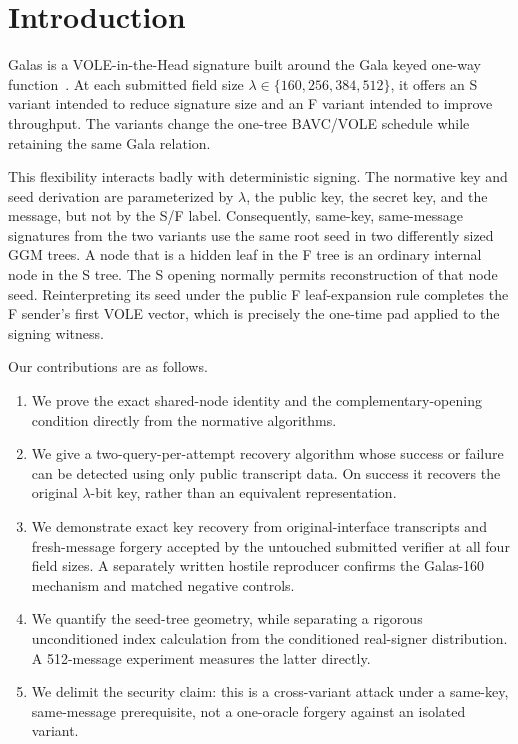 \documentclass[11pt,a4paper]{article}
\begin{document}
\section{Introduction}

Galas is a VOLE-in-the-Head signature built around the Gala keyed one-way
function~\cite{galas-spec,galas-design}.  At each submitted field size
$\lambda\in\{160,256,384,512\}$, it offers an S variant intended to reduce
signature size and an F variant intended to improve throughput.  The variants
change the one-tree BAVC/VOLE schedule while retaining the same Gala relation.

This flexibility interacts badly with deterministic signing.  The normative key
and seed derivation are parameterized by $\lambda$, the public key, the secret key,
and the message, but not by the S/F label.  Consequently, same-key, same-message
signatures from the two variants use the same root seed in two differently sized
GGM trees.  A node that is a hidden leaf in the F tree is an ordinary internal node
in the S tree.  The S opening normally permits reconstruction of that node seed.
Reinterpreting its seed
under the public F leaf-expansion rule completes the F sender's first VOLE vector,
which is precisely the one-time pad applied to the signing witness.

Our contributions are as follows.
\begin{enumerate}[leftmargin=*,itemsep=2pt]
  \item We prove the exact shared-node identity and the complementary-opening
        condition directly from the normative algorithms.
  \item We give a two-query-per-attempt recovery algorithm whose success or
        failure can be detected using only public transcript data.  On success it
        recovers the original $\lambda$-bit key, rather than an equivalent
        representation.
  \item We demonstrate exact key recovery from original-interface transcripts and
        fresh-message forgery accepted by the untouched submitted verifier at all
        four field sizes.  A separately written hostile reproducer confirms the
        Galas-160 mechanism and matched negative controls.
  \item We quantify the seed-tree geometry, while separating a rigorous
        unconditioned index calculation from the conditioned real-signer
        distribution.  A 512-message experiment measures the latter directly.
  \item We delimit the security claim: this is a cross-variant attack under a
        same-key, same-message prerequisite, not a one-oracle forgery against an
        isolated variant.
\end{enumerate}
\end{document}
